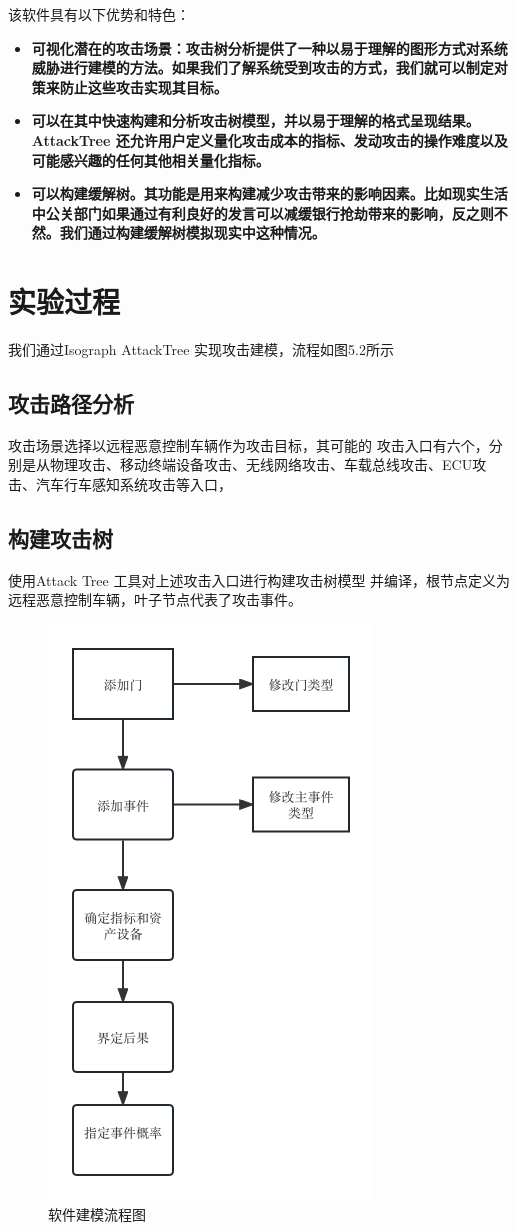 该软件具有以下优势和特色：

\begin{itemize}
  \item \textbf{可视化潜在的攻击场景：攻击树分析提供了一种以易于理解的图形方式对系统威胁进行建模的方法。如果我们了解系统受到攻击的方式，我们就可以制定对策来防止这些攻击实现其目标。}
  \item \textbf{可以在其中快速构建和分析攻击树模型，并以易于理解的格式呈现结果。AttackTree 还允许用户定义量化攻击成本的指标、发动攻击的操作难度以及可能感兴趣的任何其他相关量化指标。}
  \item \textbf{可以构建缓解树。其功能是用来构建减少攻击带来的影响因素。比如现实生活中公关部门如果通过有利良好的发言可以减缓银行抢劫带来的影响，反之则不然。我们通过构建缓解树模拟现实中这种情况。}    
\end{itemize}
\section{实验过程}
我们通过Isograph AttackTree 实现攻击建模，流程如图5.2所示
\subsection{攻击路径分析}
攻击场景选择以远程恶意控制车辆作为攻击目标，其可能的
攻击入口有六个，分别是从物理攻击、移动终端设备攻击、无线网络攻击、车载总线攻击、ECU攻击、汽车行车感知系统攻击等入口，
\subsection{构建攻击树}
使用Attack Tree 工具对上述攻击入口进行构建攻击树模型
并编译，根节点定义为远程恶意控制车辆，叶子节点代表了攻击事件。
\begin{figure}
  \centering
  \includegraphics[scale=0.5]{resources/img/c51.png}
  \caption{软件建模流程图}
\end{figure}
